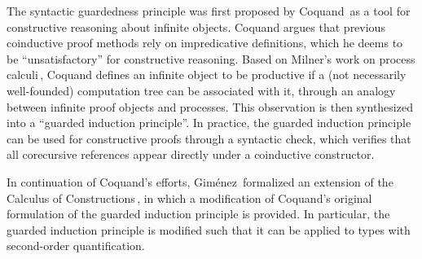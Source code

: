 
The syntactic guardedness principle was first proposed by Coquand\,\citep{Coquand94} as a tool for constructive reasoning about infinite objects. Coquand argues that previous coinductive proof methods rely on impredicative definitions, which he deems to be ``unsatisfactory'' for constructive reasoning. Based on Milner's work on process calculi\,\citep{Milner:1989}, Coquand defines an infinite object to be productive if a (not necessarily well-founded) computation tree can be associated with it, through an analogy between infinite proof objects and processes. This observation is then synthesized into a ``guarded induction principle''. In practice, the guarded induction principle can be used for constructive proofs through a syntactic check, which verifies that all corecursive references appear directly under a coinductive constructor.

In continuation of Coquand's efforts, Gim\'{e}nez\,\citep{Gimenez95} formalized an extension of the Calculus of Constructions\,\citep{Coquand:1988}, in which a modification of Coquand's original formulation of the guarded induction principle is provided. In particular, the guarded induction principle is modified such that it can be applied to types with second-order quantification.


